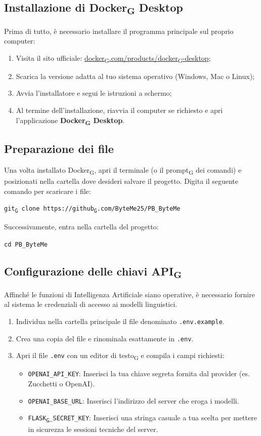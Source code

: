 \documentclass[11pt,a4paper]{article}
\newcommand{\gls}[1]{#1\textsubscript{G}}
\begin{document}
\subsection{Installazione di \gls{Docker} Desktop}
Prima di tutto, è necessario installare il programma principale sul proprio computer:
\begin{enumerate}
    \item Visita il sito ufficiale: \href{https://www.docker.com/products/docker-desktop/}{\gls{docker}.com/products/\gls{docker}-desktop};
    \item Scarica la versione adatta al tuo sistema operativo (Windows, Mac o Linux);
    \item Avvia l'installatore e segui le istruzioni a schermo;
    \item Al termine dell'installazione, riavvia il computer se richiesto e apri l'applicazione \textbf{\gls{Docker} Desktop}.
\end{enumerate}

\subsection{Preparazione dei file}
Una volta installato \gls{Docker}, apri il terminale (o il \gls{prompt} dei comandi) e posizionati nella cartella dove desideri salvare il progetto. Digita il seguente comando per scaricare i file:
\begin{center}
    \texttt{\gls{git} clone https://\gls{github}.com/ByteMe25/PB\_ByteMe}
\end{center}
Successivamente, entra nella cartella del progetto:
\begin{center}
    \texttt{cd PB\_ByteMe}
\end{center}

\subsection{Configurazione delle chiavi \gls{API}}
Affinché le funzioni di Intelligenza Artificiale siano operative, è necessario fornire al sistema le credenziali di accesso ai modelli linguistici.
\begin{enumerate}
    \item Individua nella cartella principale il file denominato \texttt{.env.example}.
    \item Crea una copia del file e rinominala esattamente in \texttt{.env}.
    \item Apri il file \texttt{.env} con un \gls{editor di testo} e compila i campi richiesti:
    \begin{itemize}
        \item \texttt{OPENAI\_API\_KEY}: Inserisci la tua chiave segreta fornita dal provider (es. Zucchetti o OpenAI).
        \item \texttt{OPENAI\_BASE\_URL}: Inserisci l'indirizzo del server che eroga i modelli.
        \item \texttt{\gls{FLASK}\_SECRET\_KEY}: Inserisci una stringa casuale a tua scelta per mettere in sicurezza le sessioni tecniche del server.
    \end{itemize}
\end{enumerate}
\end{document}
